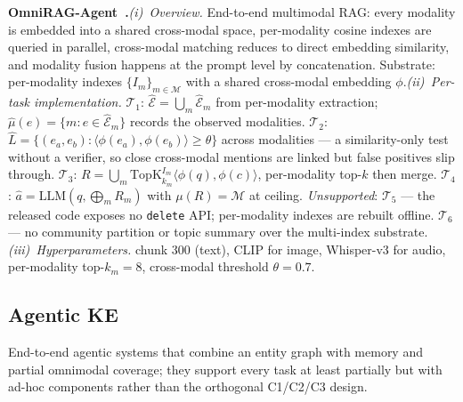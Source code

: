 \documentclass{article}
\begin{document}
\noindent\textbf{OmniRAG-Agent~\citep{OmniRAG-Agent}.}\quad\emph{(i)~Overview.} End-to-end multimodal RAG: every modality is embedded into a shared cross-modal space, per-modality cosine indexes are queried in parallel, cross-modal matching reduces to direct embedding similarity, and modality fusion happens at the prompt level by concatenation. Substrate: per-modality indexes $\{I_m\}_{m\in\mathcal{M}}$ with a shared cross-modal embedding $\phi$.\quad\emph{(ii)~Per-task implementation.} $\mathcal{T}_1$: $\hat{\mathcal{E}}\!=\!\bigcup_m\hat{\mathcal{E}}_m$ from per-modality extraction; $\hat{\mu}(e)\!=\!\{m\!:\!e\!\in\!\hat{\mathcal{E}}_m\}$ records the observed modalities. $\mathcal{T}_2$: $\hat{L}\!=\!\{(e_a,e_b)\!:\!\langle\phi(e_a),\phi(e_b)\rangle\!\geq\!\theta\}$ across modalities --- a similarity-only test without a verifier, so close cross-modal mentions are linked but false positives slip through. $\mathcal{T}_3$: $R\!=\!\bigcup_m\mathrm{TopK}_{k_m}^{I_m}\langle\phi(q),\phi(c)\rangle$, per-modality top-$k$ then merge. $\mathcal{T}_4$: $\hat{a}\!=\!\mathrm{LLM}(q,\bigoplus_m R_m)$ with $\mu(R)\!=\!\mathcal{M}$ at ceiling. \emph{Unsupported}: $\mathcal{T}_5$ — the released code exposes no \texttt{delete} API; per-modality indexes are rebuilt offline. $\mathcal{T}_6$ — no community partition or topic summary over the multi-index substrate.\quad\emph{(iii)~Hyperparameters.} chunk $300$ (text), CLIP for image, Whisper-v3 for audio, per-modality top-$k_m\!=\!8$, cross-modal threshold $\theta\!=\!0.7$.

\subsection{Agentic KE}\label{app:b-ake}

End-to-end agentic systems that combine an entity graph with memory and partial omnimodal coverage; they support every task at least partially but with ad-hoc components rather than the orthogonal C1/C2/C3 design.
\end{document}
